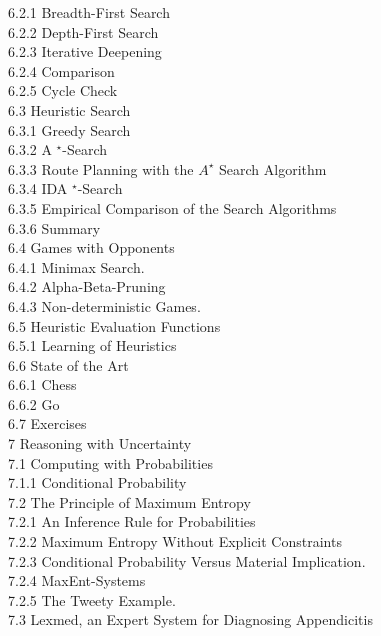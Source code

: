 \documentclass[10pt]{book}
\begin{document}
6.2.1 Breadth-First Search \\
6.2.2 Depth-First Search \\
6.2.3 Iterative Deepening \\
6.2.4 Comparison \\
6.2.5 Cycle Check \\
6.3 Heuristic Search \\
6.3.1 Greedy Search \\
6.3.2 A ${ }^{\star}$-Search \\
6.3.3 Route Planning with the $A^{\star}$ Search Algorithm \\
6.3.4 IDA ${ }^{\star}$-Search \\
6.3.5 Empirical Comparison of the Search Algorithms \\
6.3.6 Summary \\
6.4 Games with Opponents \\
6.4.1 Minimax Search. \\
6.4.2 Alpha-Beta-Pruning \\
6.4.3 Non-deterministic Games. \\
6.5 Heuristic Evaluation Functions \\
6.5.1 Learning of Heuristics \\
6.6 State of the Art \\
6.6.1 Chess \\
6.6.2 Go \\
6.7 Exercises \\
7 Reasoning with Uncertainty \\
7.1 Computing with Probabilities \\
7.1.1 Conditional Probability \\
7.2 The Principle of Maximum Entropy \\
7.2.1 An Inference Rule for Probabilities \\
7.2.2 Maximum Entropy Without Explicit Constraints \\
7.2.3 Conditional Probability Versus Material Implication. \\
7.2.4 MaxEnt-Systems \\
7.2.5 The Tweety Example. \\
7.3 Lexmed, an Expert System for Diagnosing Appendicitis \\
\end{document}
